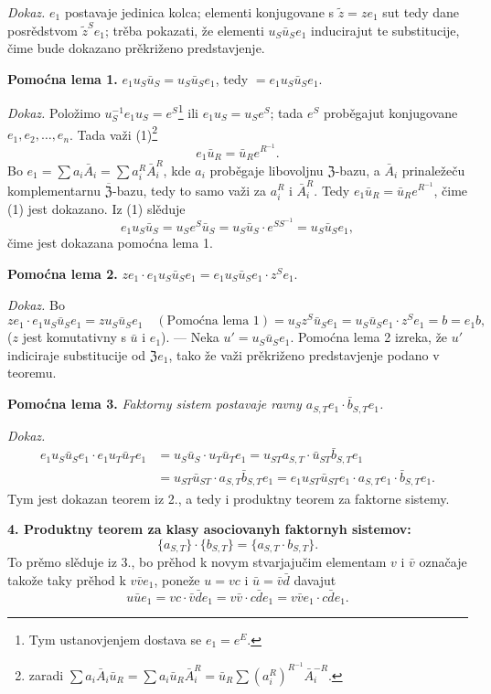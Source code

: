 \documentclass[11pt]{article}
\newcommand{\srcfn}[2]{\footnote{#2}}
\begin{document}
\noindent\emph{Dokaz.} \(e_1\) postavaje jedinica kolca; elementi konjugovane s \(\tilde z=ze_1\) sut tedy dane posrědstvom \(\tilde z^Se_1\); trěba pokazati, že elementi \(u_S\bar u_Se_1\) inducirajut te substitucije, čime bude dokazano prěkriženo predstavjenje.

\noindent\textbf{Pomoćna lema 1.} \(e_1u_S\bar u_S=u_S\bar u_Se_1\), tedy \(=e_1u_S\bar u_Se_1\).

\noindent\emph{Dokaz.} Položimo \(u_S^{-1}e_1u_S=e^S\)\srcfn{1}{Tym ustanovjenjem dostava se \(e_1=e^E\).} ili \(e_1u_S=u_Se^S\); tada \(e^S\) proběgajut konjugovane \(e_1,e_2,\ldots,e_n\). Tada važi (1)\srcfn{2}{zaradi \(\sum a_i\bar A_i\bar u_R=\sum a_i\bar u_R\bar A_i^R=\bar u_R\sum(a_i^R)^{R^{-1}}\bar A_i^{-R}\).}
\[
e_1\bar u_R=\bar u_Re^{R^{-1}}.
\]
Bo \(e_1=\sum a_i\bar A_i=\sum a_i^R\bar A_i^R\), kde \(a_i\) proběgaje libovoljnu \(\mathfrak Z\)-bazu, a \(\bar A_i\) prinaležeču komplementarnu \(\overline{\mathfrak Z}\)-bazu, tedy to samo važi za \(a_i^R\) i \(\bar A_i^R\). Tedy \(e_1\bar u_R=\bar u_Re^{R^{-1}}\), čime (1) jest dokazano. Iz (1) slěduje
\[
e_1u_S\bar u_S=u_Se^S\bar u_S=u_S\bar u_S\cdot e^{SS^{-1}}=u_S\bar u_Se_1,
\]
čime jest dokazana pomoćna lema 1.

\noindent\textbf{Pomoćna lema 2.} \(ze_1\cdot e_1u_S\bar u_Se_1=e_1u_S\bar u_Se_1\cdot z^Se_1\).

\noindent\emph{Dokaz.} Bo
\[
ze_1\cdot e_1u_S\bar u_Se_1
=zu_S\bar u_Se_1\quad(\text{Pomoćna lema 1})
=u_Sz^S\bar u_Se_1
=u_S\bar u_Se_1\cdot z^Se_1
=b=e_1b,
\]
(\(z\) jest komutativny s \(\bar u\) i \(e_1\)). --- Neka \(u'=u_S\bar u_Se_1\). Pomoćna lema 2 izreka, že \(u'\) indiciraje substitucije od \(\mathfrak Ze_1\), tako že važi prěkriženo predstavjenje podano v teoremu.

\noindent\textbf{Pomoćna lema 3.} \emph{Faktorny sistem postavaje ravny \(a_{S,T}e_1\cdot\bar b_{S,T}e_1\).}

\noindent\emph{Dokaz.}
\[
\begin{aligned}
e_1u_S\bar u_Se_1\cdot e_1u_T\bar u_Te_1
&=u_S\bar u_S\cdot u_T\bar u_Te_1
 =u_{ST}a_{S,T}\cdot\bar u_{ST}\bar b_{S,T}e_1\\
&=u_{ST}\bar u_{ST}\cdot a_{S,T}\bar b_{S,T}e_1
 =e_1u_{ST}\bar u_{ST}e_1\cdot a_{S,T}e_1\cdot\bar b_{S,T}e_1.
\end{aligned}
\]
Tym jest dokazan teorem iz 2., a tedy i produktny teorem za faktorne sistemy.

\noindent\textbf{4. Produktny teorem za klasy asociovanyh faktornyh sistemov:}
\[
\{a_{S,T}\}\cdot\{b_{S,T}\}=\{a_{S,T}\cdot b_{S,T}\}.
\]
To prěmo slěduje iz 3., bo prěhod k novym stvarjajučim elementam \(v\) i \(\bar v\) označaje takože taky prěhod k \(v\bar ve_1\), poneže \(u=vc\) i \(\bar u=\bar v\bar d\) davajut
\[
u\bar ue_1=vc\cdot\bar v\bar de_1=v\bar v\cdot c\bar de_1=v\bar ve_1\cdot c\bar de_1.
\]
\end{document}
